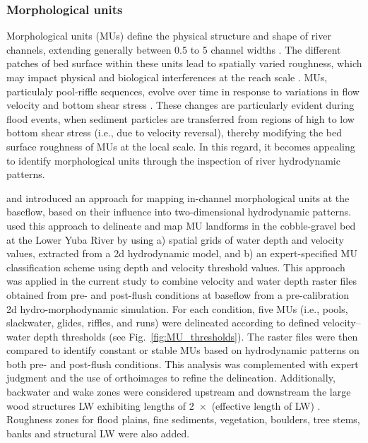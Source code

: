\subsubsection{Morphological units}
\label{subsec:calibration-parameters}
Morphological units (MUs) define the physical structure and shape of river channels, extending generally between 0.5 to 5 channel widths \cite{woodworth2022are}. The different patches of bed surface within these units lead to spatially varied roughness, which may impact physical and biological interferences at the reach scale \cite{buffington1999effects,dietrich2005sediment}. MUs, particulaly pool-riffle sequences, evolve over time in response to variations in flow velocity and bottom shear stress \cite{salmela2020morphological, pasternack2017flooddriven,cao2003flow}. These changes are particularly evident during flood events, when sediment particles are transferred from regions of high to low bottom shear stress (i.e., due to velocity reversal), thereby modifying the bed surface roughness of MUs at the local scale. In this regard, it becomes appealing to identify morphological units through the inspection of river hydrodynamic patterns. 

 and  introduced an approach for mapping in-channel morphological units at the baseflow, based on their influence into two-dimensional hydrodynamic patterns.  used this approach to delineate and map MU landforms in the cobble-gravel bed at the Lower Yuba River by using a) spatial grids of water depth and velocity values, extracted from a 2d hydrodynamic model, and b) an expert-specified MU classification scheme using depth and velocity threshold values. This approach was applied in the current study to combine velocity and water depth raster files obtained from pre- and post-flush conditions at baseflow from a pre-calibration 2d hydro-morphodynamic simulation. For each condition, five MUs (i.e., pools, slackwater, glides, riffles, and runs) were delineated according to defined velocity–water depth thresholds (see Fig.~\ref{fig:MU_thresholds}). The raster files were then compared to identify constant or stable MUs based on hydrodynamic patterns on both pre- and post-flush conditions. This analysis was complemented with expert judgment and the use of orthoimages to refine the delineation. Additionally, backwater and wake  zones were considered upstream and downstream the large wood structures LW exhibiting lengths of 2~$\times$~(effective length of LW) \cite{scolari2025hydromorphodynamic}. Roughness zones for flood plains, fine sediments, vegetation, boulders, tree stems, banks and structural LW were also added.    

